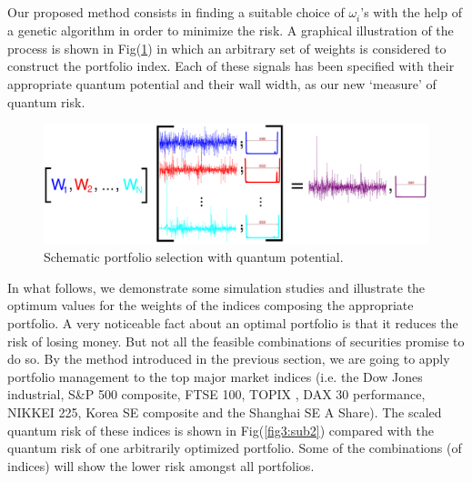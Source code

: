 \documentclass[ aip,jmp,reprint]{revtex4-2}
\begin{document}
Our proposed method consists in finding a suitable choice of $\omega
_{i}^{{}}$'s with the help of a genetic algorithm in order to minimize the
risk. A graphical illustration of the process is shown in Fig(\ref{fig:2})
in which an arbitrary set of weights is considered to construct the
portfolio index. Each of these signals has been specified with their
appropriate quantum potential and their wall width, as our new `measure' of
quantum risk.\newline
\begin{figure}[tbh]
\centering
\includegraphics[width=120mm]{new1_fig0.png}
\caption{Schematic portfolio selection with quantum potential.}
\label{fig:2}
\end{figure}
\newpage In what follows, we demonstrate some simulation studies and
illustrate the optimum values for the weights of the indices composing the
appropriate portfolio. A very noticeable fact about an optimal portfolio is
that it reduces the risk of losing money. But not all the feasible
combinations of securities promise to do so. By the method introduced in the
previous section, we are going to apply portfolio management to the top
major market indices (i.e. the Dow Jones industrial, S\&P 500 composite,
FTSE 100, TOPIX , DAX 30 performance, NIKKEI 225, Korea SE composite and the
Shanghai SE A Share). The scaled quantum risk of these indices is shown in
Fig(\ref{fig3:sub2}) compared with the quantum risk of one arbitrarily
optimized portfolio. Some of the combinations (of indices) will show the
lower risk amongst all portfolios.
\end{document}
